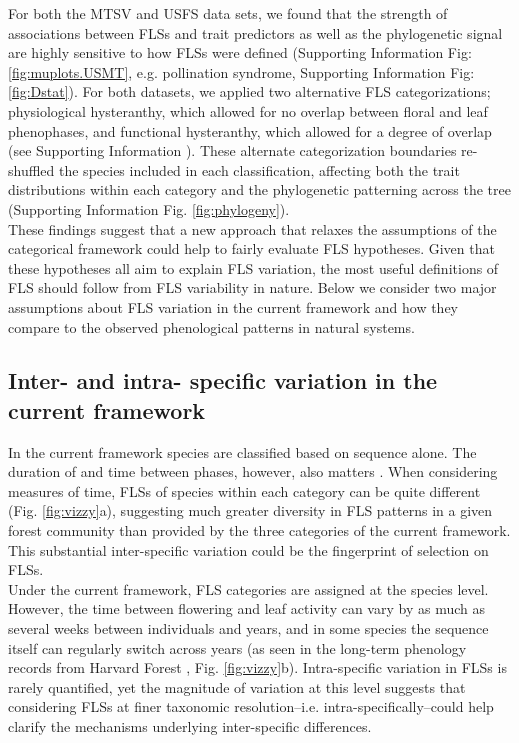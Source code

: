 \documentclass[11pt]{article}
\begin{document}
\noindent For both the MTSV and USFS data sets, we found that the strength of associations between FLSs and trait predictors as well as the phylogenetic signal are highly sensitive to how FLSs were defined (Supporting Information Fig: \ref{fig:muplots.USMT}, e.g. pollination syndrome, Supporting Information Fig: \ref{fig:Dstat}). For both datasets, we applied two alternative FLS categorizations; physiological hysteranthy, which allowed for no overlap between floral and leaf phenophases, and functional hysteranthy, which allowed for a degree of overlap (see Supporting Information ). These alternate categorization boundaries re-shuffled the species included in each classification, affecting both the trait distributions within each category and the phylogenetic patterning across the tree (Supporting Information Fig. \ref{fig:phylogeny}).\\ 
 
\noindent These findings suggest that a new approach that relaxes the assumptions of the categorical framework could help to fairly evaluate FLS hypotheses. Given that these hypotheses all aim to explain FLS variation, the most useful definitions of FLS should follow from FLS variability in nature. Below we consider two major assumptions about FLS variation in the current framework and how they compare to the observed phenological patterns in natural systems.\\

\subsection*{Inter- and intra- specific variation in the current framework}
\noindent In the current framework species are classified based on sequence alone. The duration of and time between phases, however, also matters \citep{Inouye2019}. When considering measures of time, FLSs of species within each category can be quite different (Fig. \ref{fig:vizzy}a), suggesting much greater diversity in FLS patterns in a given forest community than provided by the three categories of the current framework. This substantial inter-specific variation could be the fingerprint of selection on FLSs.\\ 

\noindent Under the current framework, FLS categories are assigned at the species level. However, the time between flowering and leaf activity can vary by as much as several weeks between individuals and years, and in some species the sequence itself can regularly switch across years (as seen in the long-term phenology records from  Harvard Forest \citep{OKeefe2015}, Fig. \ref{fig:vizzy}b). Intra-specific variation in FLSs is rarely quantified, yet the magnitude of variation at this level suggests that considering FLSs at finer taxonomic resolution--i.e. intra-specifically--could help clarify the mechanisms underlying inter-specific differences.\\
\end{document}
